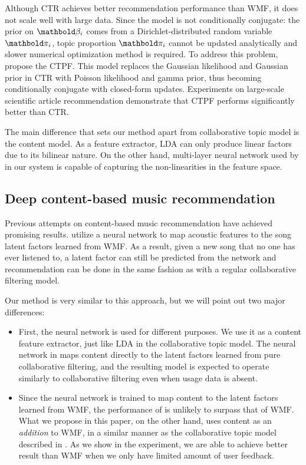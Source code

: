 Although \gls{CTR} achieves better recommendation performance than \gls{WMF}, it does not scale well with large data. Since the model is not conditionally conjugate: the prior on $\mb\beta_i$ comes from a Dirichlet-distributed random variable $\mb\pi_i$, topic proportion $\mb\pi_i$ cannot be updated analytically and slower numerical optimization method is required. 
To address this problem, \citet{gopalan2014content} propose the \gls{CTPF}. This model replaces the Gaussian likelihood and Gaussian prior in \gls{CTR} with Poisson likelihood and gamma prior, thus becoming conditionally conjugate with closed-form updates. Experiments on large-scale scientific article recommendation demonstrate that \gls{CTPF} performs significantly better than \gls{CTR}.

The main difference that sets our method apart from collaborative topic model is the content model. As a feature extractor, \gls{LDA} can only produce linear factors due to its bilinear nature. On the other hand, multi-layer neural network used by in our system is capable of capturing the non-linearities in the feature space. 

\subsection{Deep content-based music recommendation}\label{chpt:content:sec:sander}

Previous attempts on content-based music recommendation have achieved promising results. \citet{van2013deep} utilize a neural network to map acoustic features to the song latent factors learned from \gls{WMF}. As a result, given a new song that no one has ever listened to, a latent factor can still be predicted from the network and recommendation can be done in the same fashion as with a regular collaborative filtering model. 

Our method is very similar to this approach, but we will point out two major differences:
\begin{itemize}
\item First, the neural network is used for different purposes. We use it as a content feature extractor, just like \gls{LDA} in the collaborative topic model. The neural network in \citet{van2013deep} maps content directly to the latent factors learned from pure collaborative filtering, and the resulting model is expected to operate similarly to collaborative filtering even when usage data is absent.

\item Since the neural network is trained to map content to the latent factors learned from \gls{WMF}, the performance of \citet{van2013deep} is unlikely to surpass that of \gls{WMF}. What we propose in this paper, on the other hand, uses content as an \emph{addition} to \gls{WMF}, in a similar manner as the collaborative topic model described in . As we show in the experiment, we are able to achieve better result than \gls{WMF} when we only have limited amount of user feedback.  
\end{itemize}

